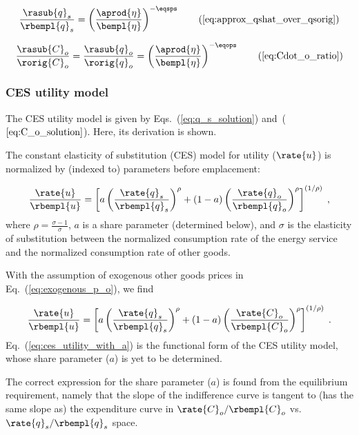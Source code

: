 \begin{equation} 
  \frac{\rasub{q}_s}{\rbempl{q}_s}
      = \left( \frac{\aprod{\eta}}{\bempl{\eta}} \right)^{-\eqsps} 
        \tag{\ref{eq:approx_qshat_over_qsorig}}
\end{equation}

\begin{equation}
  \frac{\rasub{C}_o}{\rorig{C}_o}
      = \frac{\rasub{q}_o}{\rorig{q}_o}
      = \left( \frac{\aprod{\eta}}{\bempl{\eta}} \right)^{-\eqops} \tag{\ref{eq:Cdot_o_ratio}}
\end{equation}


\subsubsection{CES utility model}
\label{sec:derivation_ces_utility}

The CES utility model is given by Eqs.~(\ref{eq:q_s_solution}) and~($\ref{eq:C_o_solution}$).
Here, its derivation is shown.

The constant elasticity of substitution (CES) model for utility ($\rate{u}$)
is normalized by (indexed to) parameters before emplacement:

\begin{equation}
  \frac{\rate{u}}{\rbempl{u}} = 
  \left[ a \left( \frac{\rate{q}_s}{\rbempl{q}_s} \right)^\rho 
        + (1-a) \left( \frac{\rate{q}_o}{\rbempl{q}_o} \right)^\rho  \right]^{(1/\rho)} \; ,
\end{equation}
%
where $\rho = \frac{\sigma - 1}{\sigma}$,
$a$ is a share parameter (determined below), and 
$\sigma$ is the elasticity of substitution between
the normalized consumption rate of the energy service and 
the normalized consumption rate of other goods.

With the assumption of exogenous other goods prices 
in Eq.~(\ref{eq:exogenous_p_o}), 
we find

\begin{equation} \label{eq:ces_utility_with_a}
  \frac{\rate{u}}{\rbempl{u}} = 
  \left[ a \left( \frac{\rate{q}_s}{\rbempl{q}_s} \right)^\rho 
        + (1-a) \left( \frac{\rate{C}_o}{\rbempl{C}_o} \right)^\rho  \right]^{(1/\rho)} \; .
\end{equation}
%
Eq.~(\ref{eq:ces_utility_with_a}) is the functional form of the CES utility model,
whose share parameter ($a$) is yet to be determined.

The correct expression for the share parameter ($a$) is found from the 
equilibrium requirement,
namely that the slope of the indifference curve is tangent to 
(has the same slope as) the expenditure curve
in $\rate{C}_o/\rbempl{C}_o$ vs.\ $\rate{q}_s/\rbempl{q}_s$ space.

